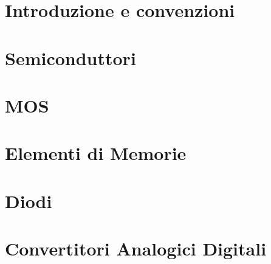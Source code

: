 \providecommand{\main}{.}






{\hypersetup{hidelinks}
  \tableofcontents  %
}

\clearpage
\chapter{Introduzione e convenzioni}
\clearpage

\clearpage
\chapter{Semiconduttori}
\clearpage

\clearpage
\chapter{MOS}
\clearpage

\clearpage
\chapter{Elementi di Memorie}
\clearpage

\clearpage
\chapter{Diodi}
\clearpage

\clearpage
\chapter{Convertitori Analogici Digitali}
\clearpage

\clearpage

\appendix
%



